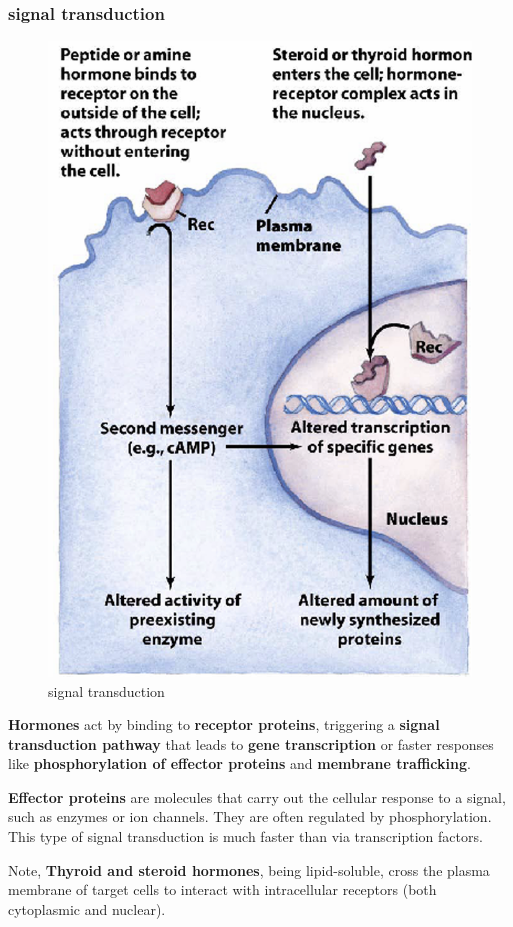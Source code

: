 \documentclass[../main.tex]{subfiles}
\begin{document}
\subsubsection{signal transduction}
\begin{figure}[H]
    \centering
    \includegraphics[width=0.3\linewidth]{signalTransduction.png}
    \caption{signal transduction}
    \label{fig:enter-label}
\end{figure}
\textbf{Hormones} act by binding to \textbf{receptor proteins}, triggering a \textbf{signal transduction pathway} that leads to \textbf{gene transcription} or faster responses like \textbf{phosphorylation of effector proteins} and \textbf{membrane trafficking}. 

\textbf{Effector proteins} are molecules that carry out the cellular response to a signal, such as enzymes or ion channels. They are often regulated by phosphorylation. This type of signal transduction is much faster than via transcription factors.

Note, \textbf{Thyroid and steroid hormones}, being lipid-soluble, cross the plasma membrane of target cells to interact with intracellular receptors (both cytoplasmic and nuclear).
\end{document}
